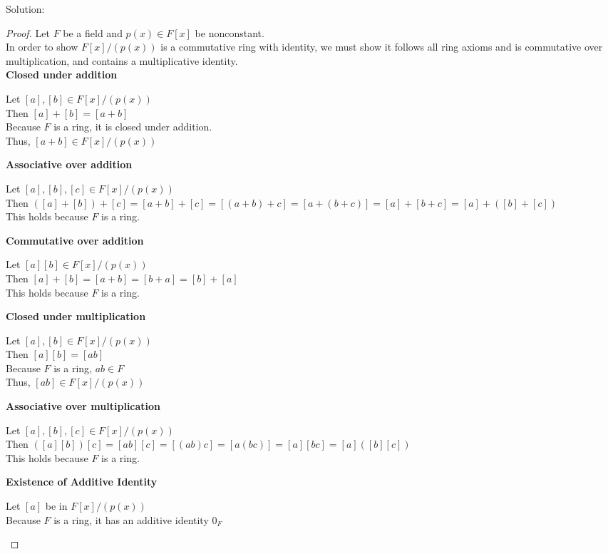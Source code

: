 \documentclass{article} %
\begin{document}
Solution: 
\begin{addmargin}[1em]{0em}
\begin{proof}
Let $F$ be a field and $p(x) \in F[x]$ be nonconstant.
\\In order to show $F[x]/(p(x))$ is a commutative ring with identity, we must show it follows all ring axioms and is commutative over multiplication, and contains a multiplicative identity.
\\ \textbf{Closed under addition}
\begin{addmargin}[1em]{0em}
Let $[a], [b] \in F[x]/(p(x))$ 
\\Then $[a] + [b] = [a + b]$
\\Because $F$ is a ring, it is closed under addition.
\\Thus, $[a + b] \in F[x]/(p(x))$
\end{addmargin}
\textbf{Associative over addition}
\begin{addmargin}[1em]{0em}
Let $[a],[b],[c] \in F[x]/(p(x))$
\\Then $([a] + [b]) + [c] = [a + b] + [c] = [(a + b) + c] = [a + (b + c)] = [a] + [b + c] = [a] + ([b] + [c])$
\\This holds because $F$ is a ring.
\end{addmargin}
\textbf{Commutative over addition}
\begin{addmargin}[1em]{0em}
Let $[a][b] \in F[x]/(p(x))$
\\Then $[a] + [b] = [a + b] = [b + a] = [b] + [a]$
\\This holds because $F$ is a ring.
\end{addmargin}
\textbf{Closed under multiplication}
\begin{addmargin}[1em]{0em}
Let $[a],[b] \in F[x]/(p(x))$
\\Then $[a][b] = [ab]$
\\Because $F$ is a ring, $ab \in F$
\\Thus, $[ab] \in F[x]/(p(x))$
\end{addmargin}
\textbf{Associative over multiplication}
\begin{addmargin}[1em]{0em}
Let $[a], [b], [c] \in F[x]/(p(x))$
\\Then $([a][b])[c] = [ab][c] = [(ab)c] = [a(bc)] = [a][bc] = [a]([b][c])$
\\This holds because $F$ is a ring.
\end{addmargin}
\textbf{Existence of Additive Identity}
\begin{addmargin}[1em]{0em}
Let $[a]$ be in $F[x]/(p(x))$
\\Because $F$ is a ring, it has an additive identity $0_F$

\end{addmargin}
\end{proof}
\end{addmargin}
\end{document}
